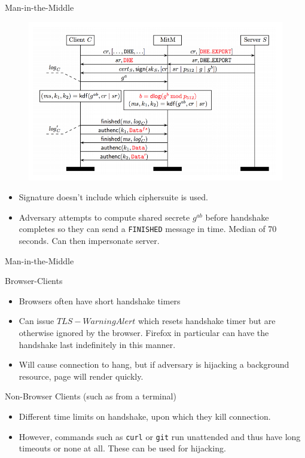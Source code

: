 \documentclass[presentation, aspectratio=54]{beamer}
\begin{document}
\begin{frame}{Man-in-the-Middle}

\begin{figure}
\centering
\includegraphics[width=0.8\columnwidth]{graphics/logjam.png}
\end{figure}

\begin{itemize}
\item Signature doesn't include which ciphersuite is used.
\item Adversary attempts to compute shared secrete $g^{ab}$ before handshake
      completes so they can send a \texttt{FINISHED} message in time. Median of
      70 seconds. Can then impersonate server.
\end{itemize} 

\end{frame}


\begin{frame}{Man-in-the-Middle}

Browser-Clients
\begin{itemize}
\item Browsers often have short handshake timers
\item Can issue $TLS-Warning Alert$ which resets handshake timer but are
      otherwise ignored by the browser. Firefox in particular can have the
      handshake last indefinitely in this manner. 
\item Will cause connection to hang, but if adversary is hijacking a
      background resource, page will render quickly.
\end{itemize}
Non-Browser Clients (such as from a terminal)
\begin{itemize}
\item Different time limits on handshake, upon which they kill connection.
\item However, commands such as \texttt{curl} or \texttt{git} run unattended
      and thus have long timeouts or none at all. These can be used for
      hijacking.
\end{itemize}

\end{frame}
\end{document}
